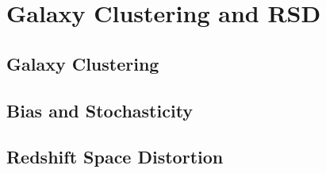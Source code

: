 \chapter{Galaxy Clustering and RSD}

\section{Galaxy Clustering}

\section{Bias and Stochasticity}

\section{Redshift Space Distortion}